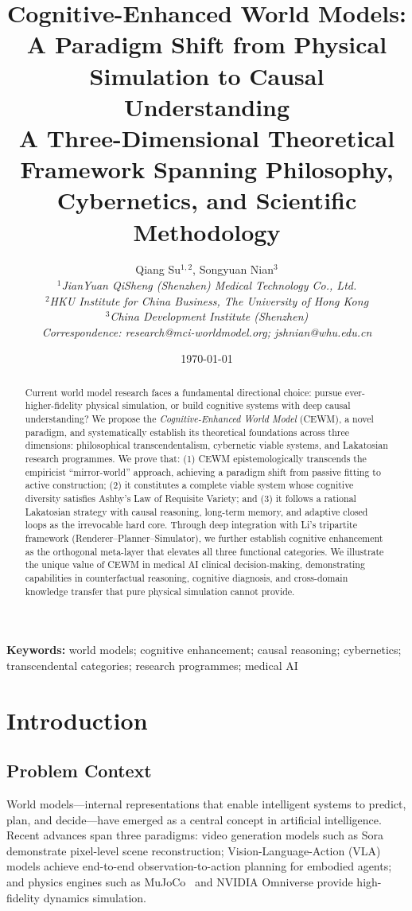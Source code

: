 \documentclass[11pt,a4paper]{article}
\title{%
  \textbf{Cognitive-Enhanced World Models: \\ A Paradigm Shift from Physical Simulation to Causal Understanding} \\[6pt]
  {\large A Three-Dimensional Theoretical Framework Spanning Philosophy, Cybernetics, and Scientific Methodology}
}
\author{%
  Qiang Su$^{1,2}$, \quad Songyuan Nian$^{3}$ \\[4pt]
  $^{1}$\textit{JianYuan QiSheng (Shenzhen) Medical Technology Co., Ltd.} \\
  $^{2}$\textit{HKU Institute for China Business, The University of Hong Kong} \\
  $^{3}$\textit{China Development Institute (Shenzhen)} \\
  \textit{Correspondence: research@mci-worldmodel.org; jshnian@whu.edu.cn}
}
\date{\today}
\newcommand{\CEWM}{\textsc{CEWM}}
\begin{document}
\maketitle

\begin{abstract}
Current world model research faces a fundamental directional choice: pursue ever-higher-fidelity physical simulation, or build cognitive systems with deep causal understanding? We propose the \emph{Cognitive-Enhanced World Model} (\CEWM{}), a novel paradigm, and systematically establish its theoretical foundations across three dimensions: philosophical transcendentalism, cybernetic viable systems, and Lakatosian research programmes. We prove that: (1) \CEWM{} epistemologically transcends the empiricist ``mirror-world'' approach, achieving a paradigm shift from passive fitting to active construction; (2) it constitutes a complete viable system whose cognitive diversity satisfies Ashby's Law of Requisite Variety; and (3) it follows a rational Lakatosian strategy with causal reasoning, long-term memory, and adaptive closed loops as the irrevocable hard core. Through deep integration with Li's tripartite framework (Renderer--Planner--Simulator), we further establish cognitive enhancement as the orthogonal meta-layer that elevates all three functional categories. We illustrate the unique value of \CEWM{} in medical AI clinical decision-making, demonstrating capabilities in counterfactual reasoning, cognitive diagnosis, and cross-domain knowledge transfer that pure physical simulation cannot provide.
\end{abstract}

\noindent\textbf{Keywords:} world models; cognitive enhancement; causal reasoning; cybernetics; transcendental categories; research programmes; medical AI

\section{Introduction}\label{sec:intro}

\subsection{Problem Context}

World models---internal representations that enable intelligent systems to predict, plan, and decide---have emerged as a central concept in artificial intelligence. Recent advances span three paradigms: video generation models such as Sora~\citep{openai2024sora} demonstrate pixel-level scene reconstruction; Vision-Language-Action (VLA) models achieve end-to-end observation-to-action planning for embodied agents; and physics engines such as MuJoCo~\citep{todorov2012mujoco} and NVIDIA Omniverse provide high-fidelity dynamics simulation.
\end{document}
